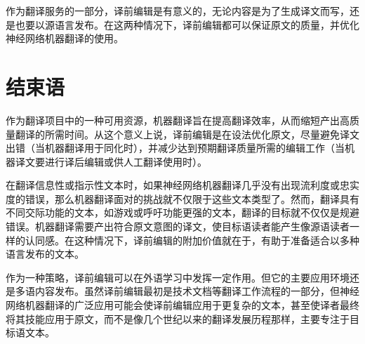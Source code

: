 \documentclass[output=paper,colorlinks,citecolor=brown]{langscibook}
\begin{document}
\begin{sloppypar}
作为翻译服务的一部分，译前编辑是有意义的，无论内容是为了生成译文而写，还是也要以源语言发布。在这两种情况下，译前编辑都可以保证原文的质量，并优化神经网络机器翻译的使用。
\end{sloppypar}

\section{结束语}

作为翻译项目中的一种可用资源，机器翻译旨在提高翻译效率，从而缩短产出高质量翻译的所需时间。从这个意义上说，译前编辑是在设法优化原文，尽量避免译文出错（当机器翻译用于同化时），并减少达到预期翻译质量所需的编辑工作（当机器译文要进行译后编辑或供人工翻译使用时）。

在翻译信息性或指示性文本时，如果神经网络机器翻译几乎没有出现流利度或忠实度的错误，那么机器翻译面对的挑战就不仅限于这些文本类型了。然而，翻译具有不同交际功能的文本，如游戏或呼吁功能更强的文本，翻译的目标就不仅仅是规避错误。机器翻译需要产出符合原文意图的译文，使目标语读者能产生像源语读者一样的认同感。在这种情况下，译前编辑的附加价值就在于，有助于准备适合以多种语言发布的文本。

作为一种策略，译前编辑可以在外语学习中发挥一定作用。但它的主要应用环境还是多语内容发布。虽然译前编辑最初是技术文档等翻译工作流程的一部分，但神经网络机器翻译的广泛应用可能会使译前编辑应用于更复杂的文本，甚至使译者最终将其技能应用于原文，而不是像几个世纪以来的翻译发展历程那样，主要专注于目标语文本。

\printbibliography[heading=subbibliography,notkeyword=this]
\end{document}
